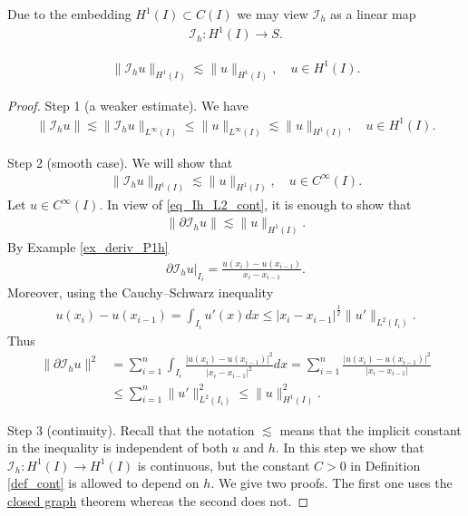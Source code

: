 \documentclass[12pt,oneside,final]{amsart}
\def\p{\partial}
\def\I{\mathcal I}
\begin{document}
Due to the embedding $H^1(I) \subset C(I)$ we may view $\I_h$ as a linear map 
    \begin{align*}
\I_h : H^1(I) \to S.
    \end{align*}

\begin{theorem}
    \begin{align*}
\|\I_h u\|_{H^1(I)} \lesssim \|u\|_{H^1(I)},
\quad u \in H^1(I).
    \end{align*}
\end{theorem}
\begin{proof} 
Step 1 (a weaker estimate).
We have 
    \begin{align}\label{eq_Ih_L2_cont}
\|\I_h u\| \lesssim \|\I_h u\|_{L^\infty(I)}
\le \|u\|_{L^\infty(I)} \lesssim \|u\|_{H^1(I)}, \quad u \in H^1(I).
    \end{align}

Step 2 (smooth case).
We will show that 
    \begin{align}\label{eq_Ih_cont_pre}
\|\I_h u\|_{H^1(I)} \lesssim \|u\|_{H^1(I)},
\quad u \in C^\infty(I).
    \end{align}
Let $u \in C^\infty(I)$. In view of \eqref{eq_Ih_L2_cont}, it is enough to show that
    \begin{align*}
\|\p \I_h u\| \lesssim \|u\|_{H^1(I)}.
    \end{align*}
By Example \ref{ex_deriv_P1h}
    \begin{align*}
\p \I_h u|_{I_i} = \frac{u(x_i) - u(x_{i-1})}{x_i - x_{i-1}}.
    \end{align*}
Moreover, using the Cauchy--Schwarz inequality
    \begin{align*}
u(x_i) - u(x_{i-1}) = \int_{I_i} u'(x) dx \le |x_i - x_{i-1}|^{\frac12} \|u'\|_{L^2(I_i)}.
    \end{align*}
Thus
    \begin{align*}
\|\p \I_h u\|^2 
&= 
\sum_{i=1}^n \int_{I_i} 
\frac{|u(x_i) - u(x_{i-1})|^2}{|x_i - x_{i-1}|^2} dx
= 
\sum_{i=1}^n \frac{|u(x_i) - u(x_{i-1})|^2}{|x_i - x_{i-1}|}
\\&\le 
\sum_{i=1}^n \|u'\|_{L^2(I_i)}^2 \le \|u\|_{H^1(I)}^2.
    \end{align*}

Step 3 (continuity).
Recall that the notation $\lesssim$ means that the implicit constant in the inequality is independent of both $u$ and $h$.
In this step we show that $\I_h : H^1(I) \to H^1(I)$ is continuous, but the constant $C > 0$ in Definition \ref{def_cont} is allowed to depend on $h$. We give two proofs. The first one uses 
the \href{https://en.wikipedia.org/wiki/Closed_graph_theorem}{closed graph} theorem whereas the second does not.


\end{proof}
\end{document}
